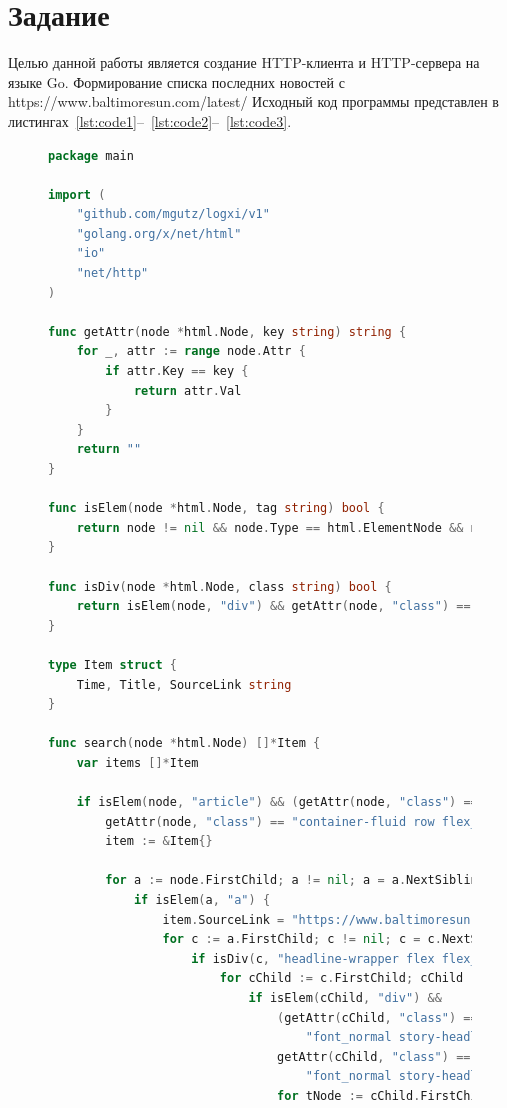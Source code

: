 \documentclass[a4paper, 14pt]{extarticle}
\begin{document}
\renewcommand{\ttdefault}{pcr}

\setlength{\tabcolsep}{3pt}
\newpage
\setcounter{page}{2}
\section{Задание}\label{Sect::task}
Целью данной работы является создание HTTP-клиента и HTTP-сервера на языке Go.
Формирование списка последних новостей с
https://www.baltimoresun.com/latest/
Исходный код программы представлен в листингах~\ref{lst:code1}--~\ref{lst:code2}--~\ref{lst:code3}.

\begin{figure}[!htb]
\begin{lstlisting}[language={Go},caption={download.go},label={lst:code1}]
package main

import (
	"github.com/mgutz/logxi/v1"
	"golang.org/x/net/html"
	"io"
	"net/http"
)

func getAttr(node *html.Node, key string) string {
	for _, attr := range node.Attr {
		if attr.Key == key {
			return attr.Val
		}
	}
	return ""
}

func isElem(node *html.Node, tag string) bool {
	return node != nil && node.Type == html.ElementNode && node.Data == tag
}

func isDiv(node *html.Node, class string) bool {
	return isElem(node, "div") && getAttr(node, "class") == class
}

type Item struct {
	Time, Title, SourceLink string
}

func search(node *html.Node) []*Item {
	var items []*Item

	if isElem(node, "article") && (getAttr(node, "class") == "container-fluid row flex_row " ||
		getAttr(node, "class") == "container-fluid row flex_row padding-sm-bottom") {
		item := &Item{}

		for a := node.FirstChild; a != nil; a = a.NextSibling {
			if isElem(a, "a") {
				item.SourceLink = "https://www.baltimoresun.com" + getAttr(a, "href")
				for c := a.FirstChild; c != nil; c = c.NextSibling {
					if isDiv(c, "headline-wrapper flex flex_col col-sm-xl-7") {
						for cChild := c.FirstChild; cChild != nil; cChild = cChild.NextSibling {
							if isElem(cChild, "div") &&
								(getAttr(cChild, "class") == "promo-headline font_20_custom font_mobile_custom "+
									"font_normal story-headline-link color_primary decoration_none  ") ||
								getAttr(cChild, "class") == "promo-headline font_18_custom font_mobile_custom "+
									"font_normal story-headline-link color_primary decoration_none  " {
								for tNode := cChild.FirstChild; tNode != nil; tNode = 

\end{lstlisting}
\end{figure}
\end{document}
